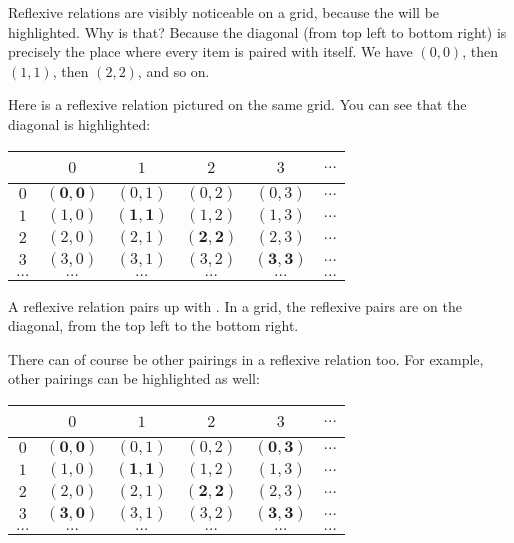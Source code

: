 \documentclass[../../../main.tex]{subfiles}
\begin{document}
Reflexive relations are visibly noticeable on a grid, because the  will be highlighted. Why is that? Because the diagonal (from top left to bottom right) is precisely the place where every item is paired with itself. We have $(0, 0)$, then $(1, 1)$, then $(2, 2)$, and so on.

Here is a reflexive relation pictured on the same grid. You can see that the diagonal is highlighted:

\begin{center}
  \begin{tabular}{| c | c | c | c | c | c |}
    \hline
    ~   & $0$      & $1$      & $2$      & $3$      & $\ldots$ \\ \hline
    $0$ & \textcolor{vocabcolor}{$\mathbf{(0, 0)}$} & $(0, 1)$ & $(0, 2)$ & $(0, 3)$ & $\ldots$ \\ \hline
    $1$ & $(1, 0)$ & \textcolor{vocabcolor}{$\mathbf{(1, 1)}$} & $(1, 2)$ & $(1, 3)$ & $\ldots$ \\ \hline
    $2$ & $(2, 0)$ & $(2, 1)$ & \textcolor{vocabcolor}{$\mathbf{(2, 2)}$} & $(2, 3)$ & $\ldots$ \\ \hline
    $3$ & $(3, 0)$ & $(3, 1)$ & $(3, 2)$ & \textcolor{vocabcolor}{$\mathbf{(3, 3)}$} & $\ldots$ \\ \hline
    $\ldots$ & $\ldots$ & $\ldots$ & $\ldots$ & $\ldots$ & $\ldots$ \\ \hline                
  \end{tabular}
\end{center}

\begin{aside}
  \begin{remark}
    A reflexive relation pairs up  with . In a grid, the reflexive pairs are on the diagonal, from the top left to the bottom right.
  \end{remark}
\end{aside}

There can of course be other pairings in a reflexive relation too. For example, other pairings can be highlighted as well:

\begin{center}
  \begin{tabular}{| c | c | c | c | c | c |}
    \hline
    ~   & $0$      & $1$      & $2$      & $3$      & $\ldots$ \\ \hline
    $0$ & \textcolor{vocabcolor}{$\mathbf{(0, 0)}$} & $(0, 1)$ & $(0, 2)$ & \textcolor{vocabcolor}{$\mathbf{(0, 3)}$} & $\ldots$ \\ \hline
    $1$ & $(1, 0)$ & \textcolor{vocabcolor}{$\mathbf{(1, 1)}$} & $(1, 2)$ & $(1, 3)$ & $\ldots$ \\ \hline
    $2$ & $(2, 0)$ & $(2, 1)$ & \textcolor{vocabcolor}{$\mathbf{(2, 2)}$} & $(2, 3)$ & $\ldots$ \\ \hline
    $3$ & \textcolor{vocabcolor}{$\mathbf{(3, 0)}$} & $(3, 1)$ & $(3, 2)$ & \textcolor{vocabcolor}{$\mathbf{(3, 3)}$} & $\ldots$ \\ \hline
    $\ldots$ & $\ldots$ & $\ldots$ & $\ldots$ & $\ldots$ & $\ldots$ \\ \hline                
  \end{tabular}
\end{center}
\end{document}
